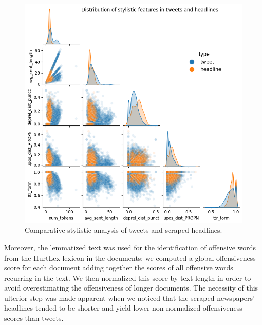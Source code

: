 \begin{figure}
    \includegraphics[width=\columnwidth]{../../results/images/style.png}
    \caption{Comparat{}ive stylistic analysis of tweets and scraped headlines.}
    \label{fig:style}
\end{figure}

Moreover, the lemmatized text was used for the identification of offensive words from the HurtLex lexicon in the documents: we computed a global offensiveness score for each document adding together the scores of all offensive words recurring in the text.
We then normalized this score by text length in order to avoid overestimating the offensiveness of longer documents.
The necessity of this ulterior step was made apparent when we noticed that the scraped newspapers' headlines tended to be shorter and yield lower non normalized offensiveness scores than tweets.